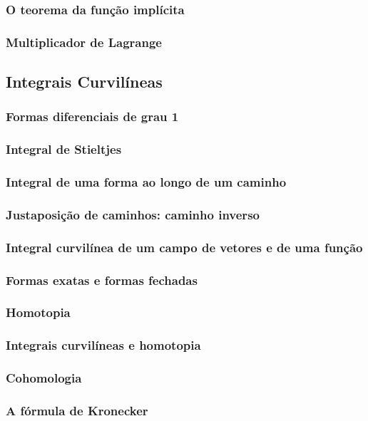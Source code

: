 \documentclass{article}
\theoremstyle{theorem}
\theoremstyle{lemma}
\theoremstyle{definition}
\theoremstyle{remark}
\begin{document}
   \subsubsection{O teorema da função implícita}
   \subsubsection{ Multiplicador de Lagrange}
\subsection{ Integrais Curvilíneas}
   \subsubsection{Formas diferenciais de grau 1}
   \subsubsection{Integral de Stieltjes}
   \subsubsection{Integral de uma forma ao longo de um caminho}
   \subsubsection{Justaposição de caminhos: caminho inverso}
   \subsubsection{Integral curvilínea de um campo de vetores e de uma função}
   \subsubsection{Formas exatas e formas fechadas}
   \subsubsection{Homotopia}
   \subsubsection{Integrais curvilíneas e homotopia}
   \subsubsection{Cohomologia}
   \subsubsection{ A fórmula de Kronecker}
\end{document}
